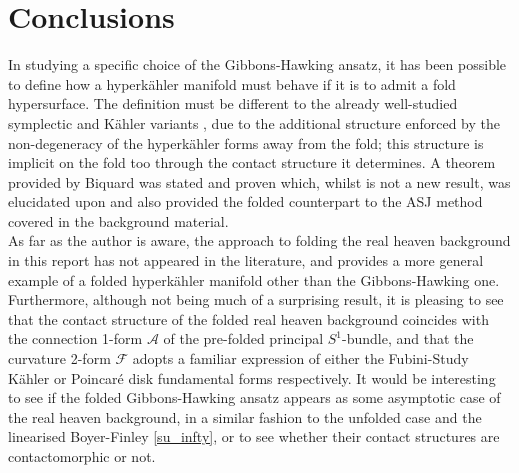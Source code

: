 \documentclass[a4paper,12pt, onecolumn, notitlepage]{article}
\theoremstyle{definition}
\theoremstyle{remark}
\newcommand{\K}{K\"ahler }
\newcommand{\HK}{hyperk\"ahler }
\begin{document}
\section{Conclusions}
In studying a specific choice of the Gibbons-Hawking ansatz, it has been possible to define how a \HK manifold must behave if it is to admit a fold hypersurface. The definition must be different to the already well-studied symplectic and \K variants \cite{dasilva_2000, baykur_2006}, due to the additional structure enforced by the non-degeneracy of the \HK forms away from the fold; this structure is implicit on the fold too through the contact structure it determines. A theorem provided by Biquard \cite{biquard_2015} was stated and proven which, whilst is not a new result, was elucidated upon and also provided the folded counterpart to the ASJ method covered in the background material.\\
As far as the author is aware, the approach to folding the real heaven background in this report has not appeared in the literature, and provides a more general example of a folded \HK manifold other than the Gibbons-Hawking one. Furthermore, although not being much of a surprising result, it is pleasing to see that the contact structure of the folded real heaven background coincides with the connection 1-form $\mathcal{A}$ of the pre-folded principal $S^{1}$-bundle, and that the curvature 2-form $\mathcal{F}$ adopts a familiar expression of either the Fubini-Study \K or Poincar\'e disk fundamental forms respectively. It would be interesting to see if the folded Gibbons-Hawking ansatz appears as some asymptotic case of the real heaven background, in a similar fashion to the unfolded case and the linearised Boyer-Finley \cref{su_infty}, or to see whether their contact structures are contactomorphic or not.


 

	
\end{document}
